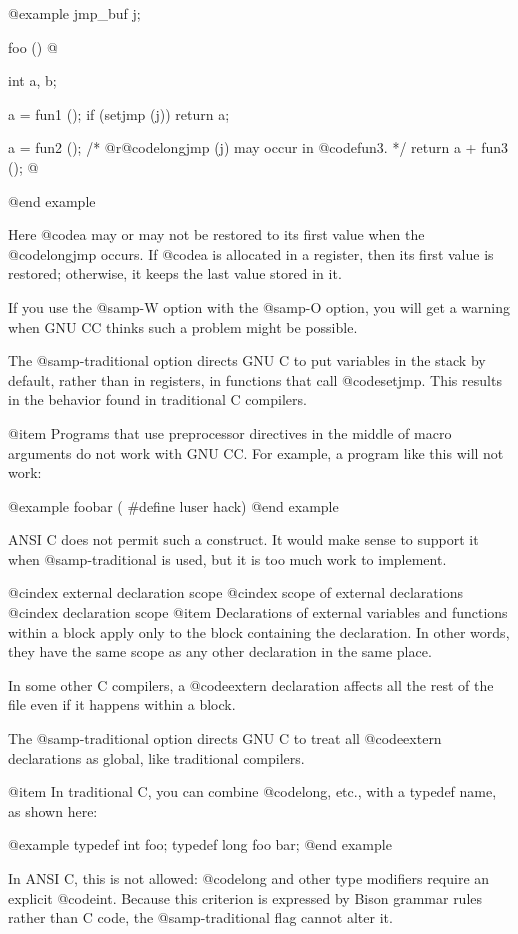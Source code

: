 @example
jmp_buf j;

foo ()
@{
  int a, b;

  a = fun1 ();
  if (setjmp (j))
    return a;

  a = fun2 ();
  /* @r{@code{longjmp (j)} may occur in @code{fun3}.} */
  return a + fun3 ();
@}
@end example

Here @code{a} may or may not be restored to its first value when the
@code{longjmp} occurs.  If @code{a} is allocated in a register, then
its first value is restored; otherwise, it keeps the last value stored
in it.

If you use the @samp{-W} option with the @samp{-O} option, you will
get a warning when GNU CC thinks such a problem might be possible.

The @samp{-traditional} option directs GNU C to put variables in
the stack by default, rather than in registers, in functions that
call @code{setjmp}.  This results in the behavior found in
traditional C compilers.

@item
Programs that use preprocessor directives in the middle of macro
arguments do not work with GNU CC.  For example, a program like this
will not work:

@example
foobar (
#define luser
        hack)
@end example

ANSI C does not permit such a construct.  It would make sense to support
it when @samp{-traditional} is used, but it is too much work to
implement.

@cindex external declaration scope
@cindex scope of external declarations
@cindex declaration scope
@item
Declarations of external variables and functions within a block apply
only to the block containing the declaration.  In other words, they
have the same scope as any other declaration in the same place.

In some other C compilers, a @code{extern} declaration affects all the
rest of the file even if it happens within a block.

The @samp{-traditional} option directs GNU C to treat all @code{extern}
declarations as global, like traditional compilers.

@item
In traditional C, you can combine @code{long}, etc., with a typedef name,
as shown here:

@example
typedef int foo;
typedef long foo bar;
@end example

In ANSI C, this is not allowed: @code{long} and other type modifiers
require an explicit @code{int}.  Because this criterion is expressed
by Bison grammar rules rather than C code, the @samp{-traditional}
flag cannot alter it.

